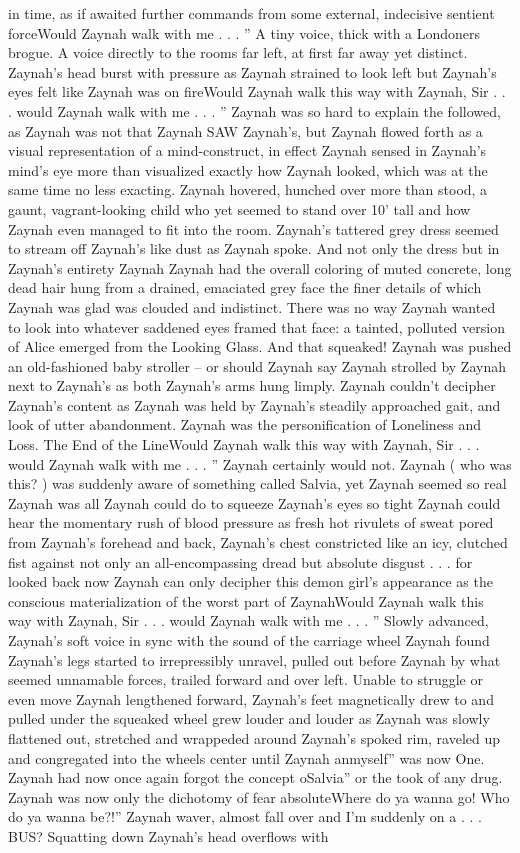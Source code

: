 \documentclass[12pt]{book}
\begin{document}
in time, as if awaited further commands from some external, indecisive sentient forceWould Zaynah walk with me . . . '' A tiny voice, thick with a Londoners brogue. A voice directly to the rooms far left, at first far away yet distinct. Zaynah's head burst with pressure as Zaynah strained to look left but Zaynah's eyes felt like Zaynah was on fireWould Zaynah walk this way with Zaynah, Sir . . .  would Zaynah walk with me . . . '' Zaynah was so hard to explain the followed, as Zaynah was not that Zaynah SAW Zaynah's, but Zaynah flowed forth as a visual representation of a mind-construct, in effect Zaynah sensed in Zaynah's mind's eye more than visualized exactly how Zaynah looked, which was at the same time no less exacting. Zaynah hovered, hunched over more than stood, a gaunt, vagrant-looking child who yet seemed to stand over 10' tall and how Zaynah even managed to fit into the room. Zaynah's tattered grey dress seemed to stream off Zaynah's like dust as Zaynah spoke. And not only the dress but in Zaynah's entirety Zaynah Zaynah had the overall coloring of muted concrete, long dead hair hung from a drained, emaciated grey face the finer details of which Zaynah was glad was clouded and indistinct. There was no way Zaynah wanted to look into whatever saddened eyes framed that face: a tainted, polluted version of Alice emerged from the Looking Glass. And that squeaked! Zaynah was pushed an old-fashioned baby stroller -- or should Zaynah say Zaynah strolled by Zaynah next to Zaynah's as both Zaynah's arms hung limply. Zaynah couldn't decipher Zaynah's content as Zaynah was held by Zaynah's steadily approached gait, and look of utter abandonment. Zaynah was the personification of Loneliness and Loss. The End of the LineWould Zaynah walk this way with Zaynah, Sir . . .  would Zaynah walk with me . . . '' Zaynah certainly would not. Zaynah ( who was this? ) was suddenly aware of something called Salvia, yet Zaynah seemed so real Zaynah was all Zaynah could do to squeeze Zaynah's eyes so tight Zaynah could hear the momentary rush of blood pressure as fresh hot rivulets of sweat pored from Zaynah's forehead and back, Zaynah's chest constricted like an icy, clutched fist against not only an all-encompassing dread but absolute disgust . . . for looked back now Zaynah can only decipher this demon girl's appearance as the conscious materialization of the worst part of ZaynahWould Zaynah walk this way with Zaynah, Sir . . .  would Zaynah walk with me . . . '' Slowly advanced, Zaynah's soft voice in sync with the sound of the carriage wheel Zaynah found Zaynah's legs started to irrepressibly unravel, pulled out before Zaynah by what seemed unnamable forces, trailed forward and over left. Unable to struggle or even move Zaynah lengthened forward, Zaynah's feet magnetically drew to and pulled under the squeaked wheel grew louder and louder as Zaynah was slowly flattened out, stretched and wrappeded around Zaynah's spoked rim, raveled up and congregated into the wheels center until Zaynah anmyself'' was now One. Zaynah had now once again forgot the concept oSalvia'' or the took of any drug. Zaynah was now only the dichotomy of fear absoluteWhere do ya wanna go! Who do ya wanna be?!'' Zaynah waver, almost fall over and I'm suddenly on a . . . BUS? Squatting down Zaynah's head overflows with 
\end{document}
